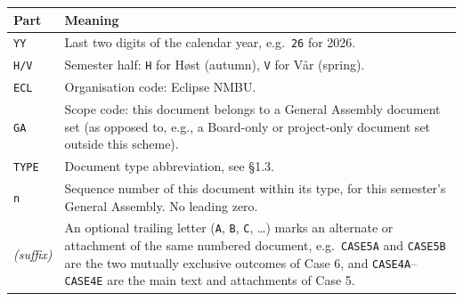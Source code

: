 \documentclass{../../../Common/Latex/Templates/rapport}
\begin{document}
\begin{longtable}{|L{2.3cm}|L{11cm}|}
  \hline
  \textbf{Part}   & \textbf{Meaning}                                                                                                                                                                                                                                                                                                        \\
  \hline
  \endhead
  \texttt{YY}     & Last two digits of the calendar year, e.g.\ \texttt{26} for 2026.                                                                                                                                                                                                                                                       \\
  \hline
  \texttt{H/V}    & Semester half: \texttt{H} for Høst (autumn), \texttt{V} for Vår (spring).                                                                                                                                                                                                                                               \\
  \hline
  \texttt{ECL}    & Organisation code: Eclipse NMBU.                                                                                                                                                                                                                                                                                        \\
  \hline
  \texttt{GA}     & Scope code: this document belongs to a General Assembly document set (as opposed to, e.g., a Board-only or project-only document set outside this scheme).                                                                                                                                                              \\
  \hline
  \texttt{TYPE}   & Document type abbreviation, see \S1.3.                                                                                                                                                                                                                                                                                  \\
  \hline
  \texttt{n}      & Sequence number of this document within its type, for this semester's General Assembly. No leading zero.                                                                                                                                                                                                                \\
  \hline
  \emph{(suffix)} & An optional trailing letter (\texttt{A}, \texttt{B}, \texttt{C}, \ldots) marks an alternate or attachment of the same numbered document, e.g.\ \texttt{CASE5A} and \texttt{CASE5B} are the two mutually exclusive outcomes of Case 6, and \texttt{CASE4A}--\texttt{CASE4E} are the main text and attachments of Case 5. \\
  \hline
\end{longtable}
\end{document}
